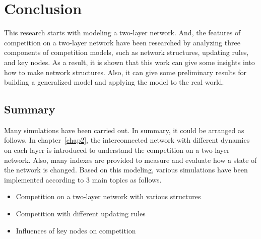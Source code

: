 
\chapter{Conclusion}
\label{chap6}

This research starts with modeling a two-layer network.  And, the features of competition on a two-layer network have been researched by analyzing three components of competition models, such as network structures, updating rules, and key nodes.  As a result,  it is shown that this work can give some insights into how to make network structures. Also, it can give some preliminary results for building a generalized model and applying the model to the real world.\\
 
\section{Summary}
Many simulations have been carried out. In summary, it could be arranged as follows. 
In chapter~\ref{chap2}, the interconnected network with different dynamics on each layer is introduced to understand the competition on a two-layer network.  Also, many indexes are provided to measure and evaluate how a state of the network is changed. Based on this modeling, various simulations have been implemented according to 3 main topics as follows.

\begin{itemize}
\item Competition on a two-layer network with various structures
\item Competition with different updating rules
\item Influences of key nodes on competition
\end{itemize}

